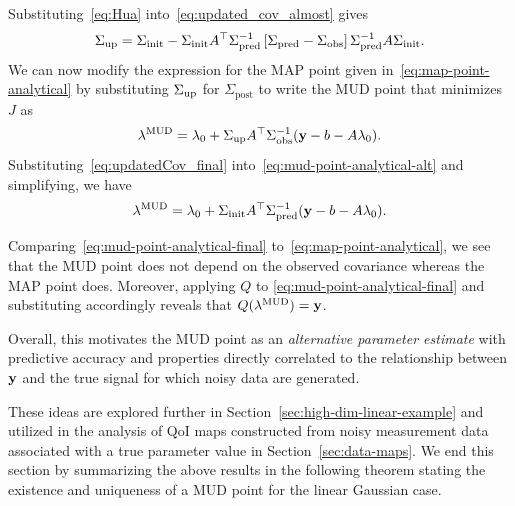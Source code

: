 Substituting~\eqref{eq:Hua} into~\eqref{eq:updated_cov_almost} gives
\begin{equation}\label{eq:updatedCov_final}
	\Sigma_\text{up} = \Sigma_\text{init} - \Sigma_\text{init} A^\top \Sigma_\text{pred}^{-1}\left[\Sigma_\text{pred}-\Sigma_\text{obs}\right]\Sigma_\text{pred}^{-1}A\Sigma_\text{init}.
\end{equation}
We can now modify the expression for the MAP point given in~\eqref{eq:map-point-analytical} by substituting $\Sigma_\text{up}$ for $\Sigma_\text{post}$ to write the MUD point that minimizes $J$ as
\begin{equation}\label{eq:mud-point-analytical-alt}
\lambda^{\text{MUD}} = \lambda_0 + \Sigma_\text{up} A^\top \Sigma_\text{obs}^{-1} (\mathbf{y} - b - A\lambda_0).
\end{equation}
Substituting~\eqref{eq:updatedCov_final} into~\eqref{eq:mud-point-analytical-alt} and simplifying, we have
\begin{equation}\label{eq:mud-point-analytical-final}
	\lambda^{\text{MUD}} = \lambda_0 + \Sigma_\text{init} A^\top \Sigma_\text{pred}^{-1}(\mathbf{y} - b - A\lambda_0).
\end{equation}

Comparing~\eqref{eq:mud-point-analytical-final} to~\eqref{eq:map-point-analytical}, we
see that the MUD point does not depend on the observed covariance whereas the MAP point does.
Moreover, applying $Q$ to \eqref{eq:mud-point-analytical-final} and substituting accordingly reveals that $Q(\lambda^{\text{MUD}}) = \mathbf{y}$.

Overall, this motivates the MUD point as an \emph{alternative parameter estimate} with predictive accuracy and properties directly correlated to the relationship between $\mathbf{y}$ and the true signal for which noisy data are generated.

These ideas are explored further in Section~\ref{sec:high-dim-linear-example} and utilized in the analysis of QoI maps constructed from noisy measurement data associated with a true parameter value in Section~\ref{sec:data-maps}.
We end this section by summarizing the above results in the following theorem stating the existence and uniqueness of a MUD point for the linear Gaussian case.

